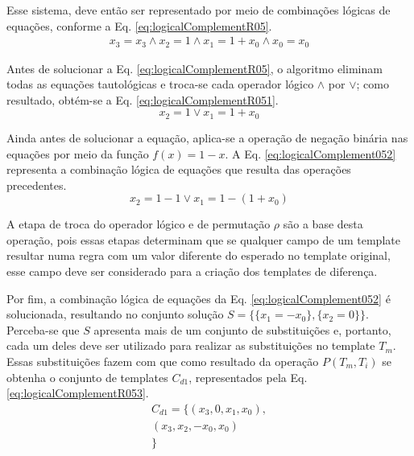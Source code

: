 Esse sistema, deve então ser representado por meio de combinações lógicas de equações, conforme a Eq. \eqref{eq:logicalComplementR05}.
\begin{equation}
\begin{split}
x_3 = x_3		\wedge  
x_2 = 1			\wedge  
x_1 = 1+x_0		\wedge  
x_0 = x_0
\end{split}
\label{eq:logicalComplementR05}
\end{equation}

Antes de solucionar a Eq. \eqref{eq:logicalComplementR05}, o algoritmo eliminam todas as equações tautológicas e troca-se cada operador lógico $\wedge$ por $\vee$; como resultado, obtém-se a Eq. \eqref{eq:logicalComplementR051}.
\begin{equation}
x_2 = 1		\vee	x_1 = 1+x_0
\label{eq:logicalComplementR051}
\end{equation}

Ainda antes de solucionar a equação, aplica-se a operação de negação binária nas equações por meio da função $f(x) = 1 - x$. A Eq. \eqref{eq:logicalComplement052} representa a combinação lógica de equações que resulta das operações precedentes.
\begin{equation}
x_2 = 1 - 1		\vee	x_1 = 1 - (1 + x_0)
\label{eq:logicalComplement052}
\end{equation}

A etapa de troca do operador lógico e de permutação $\rho$ são a base desta operação, pois essas etapas determinam que se qualquer campo de um template resultar numa regra com um valor diferente do esperado no template original, esse campo deve ser considerado para a criação dos templates de diferença.

Por fim, a combinação lógica de equações da Eq. \eqref{eq:logicalComplement052} é solucionada, resultando no conjunto solução $S = \{\{x_1 = -x_0\}, \{x_2 = 0\}\}$. Perceba-se que $S$ apresenta mais de um conjunto de substituições e, portanto, cada um deles deve ser utilizado para realizar as substituições no template $T_m$. Essas substituições fazem com que como resultado da operação $P(T_m, T_i)$ se obtenha o conjunto de templates $C_{d1}$, representados pela Eq. \eqref{eq:logicalComplementR053}.
\begin{equation}
\begin{split}
C_{d1} = \{(x_3, 0, x_1, x_0), \\(x_3, x_2, -x_0, x_0)\\\}
\end{split}
\label{eq:logicalComplementR053}
\end{equation}

